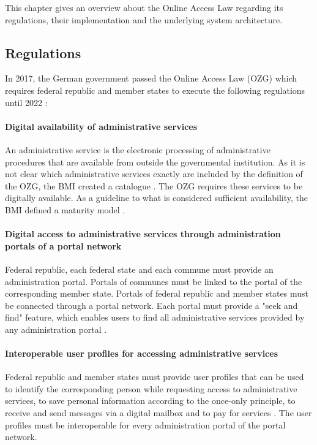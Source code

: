 This chapter gives an overview about the Online Access Law regarding its regulations, their implementation and the underlying system architecture.

\subsection{Regulations}

In 2017, the German government passed the Online Access Law (OZG) which requires federal republic and member states to execute the following regulations until 2022 \cite{BMI:OZG_Wortlaut}:

\paragraph{Digital availability of administrative services} An administrative service is the electronic processing of administrative procedures that are available from outside the governmental institution.  As it is not clear which administrative services exactly are included by the definition of the OZG, the BMI created a catalogue \cite{BMI:Verwaltungsleistungen}. The OZG requires these services to be digitally available. As a guideline to what is considered sufficient availability, the BMI defined a maturity model \cite{BMI:Digitale_Services}.

\paragraph{Digital access to administrative services through administration portals of a portal network} Federal republic, each federal state and each commune must provide an administration portal. Portals of communes must be linked to the portal of the corresponding member state. Portals of federal republic and member states must be connected through a portal network. \cite{BMI:Portalverbund} Each portal must provide a "seek and find" feature, which enables users to find all administrative services provided by any administration portal \cite{Cotar:Drucksache_19/19089}. 

\paragraph{Interoperable user profiles for accessing administrative services} Federal republic and member states must provide user profiles that can be used to identify the corresponding person while requesting access to administrative services, to save personal information according to the once-only principle, to receive and send messages via a digital mailbox and to pay for services \cite{Cotar:Drucksache_19/19089}. The user profiles must be interoperable for every administration portal of the portal network.

